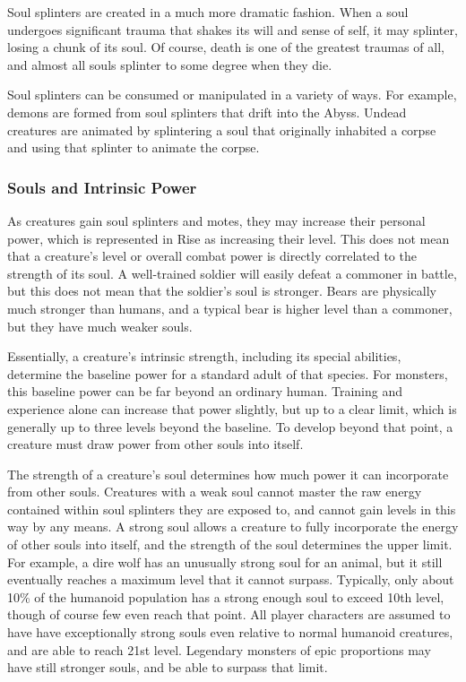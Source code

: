             Soul splinters are created in a much more dramatic fashion.
            When a soul undergoes significant trauma that shakes its will and sense of self, it may splinter, losing a chunk of its soul.
            Of course, death is one of the greatest traumas of all, and almost all souls splinter to some degree when they die.

            Soul splinters can be consumed or manipulated in a variety of ways.
            For example, demons are formed from soul splinters that drift into the Abyss.
            Undead creatures are animated by splintering a soul that originally inhabited a corpse and using that splinter to animate the corpse.

        \subsubsection{Souls and Intrinsic Power}
            As creatures gain soul splinters and motes, they may increase their personal power, which is represented in Rise as increasing their level.
            This does not mean that a creature's level or overall combat power is directly correlated to the strength of its soul.
            A well-trained soldier will easily defeat a commoner in battle, but this does not mean that the soldier's soul is stronger.
            Bears are physically much stronger than humans, and a typical bear is higher level than a commoner, but they have much weaker souls.

            Essentially, a creature's intrinsic strength, including its special abilities, determine the baseline power for a standard adult of that species.
            For monsters, this baseline power can be far beyond an ordinary human.
            Training and experience alone can increase that power slightly, but up to a clear limit, which is generally up to three levels beyond the baseline.
            To develop beyond that point, a creature must draw power from other souls into itself.

            The strength of a creature's soul determines how much power it can incorporate from other souls.
            Creatures with a weak soul cannot master the raw energy contained within soul splinters they are exposed to, and cannot gain levels in this way by any means.
            A strong soul allows a creature to fully incorporate the energy of other souls into itself, and the strength of the soul determines the upper limit.
            For example, a dire wolf has an unusually strong soul for an animal, but it still eventually reaches a maximum level that it cannot surpass.
            Typically, only about 10\% of the humanoid population has a strong enough soul to exceed 10th level, though of course few even reach that point.
            All player characters are assumed to have have exceptionally strong souls even relative to normal humanoid creatures, and are able to reach 21st level.
            Legendary monsters of epic proportions may have still stronger souls, and be able to surpass that limit.

